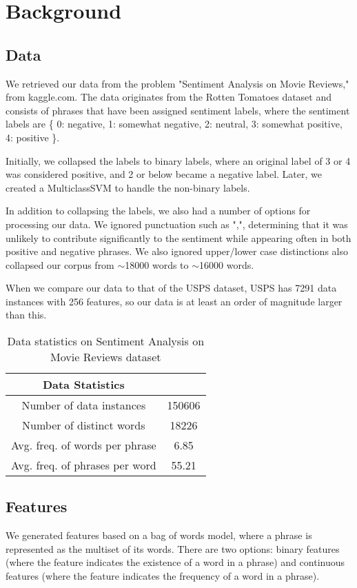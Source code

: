 \documentclass[letterpaper, 11pt]{article}
\begin{document}
\section{Background}

\subsection{Data}
We retrieved our data from the problem "Sentiment Analysis on Movie Reviews," from kaggle.com.  The data originates from the Rotten Tomatoes dataset and consists of phrases that have been assigned sentiment labels, where the sentiment labels are \{ 0: negative, 1: somewhat negative, 2: neutral, 3: somewhat positive, 4: positive \}.

 Initially, we collapsed the labels to binary labels, where an original label of 3 or 4 was considered positive, and 2 or below became a negative label.  Later, we created a MulticlassSVM to handle the non-binary labels.  

 In addition to collapsing the labels, we also had a number of options for processing our data.  We ignored punctuation such as  ",", determining that it was unlikely to contribute significantly to the sentiment while appearing often in both positive and negative phrases.  We also ignored upper/lower case distinctions also collapsed our corpus from $\sim$18000 words to $\sim$16000 words.

 When we compare our data to that of the USPS dataset, USPS has 7291 data instances with 256 features, so our data is at least an order of magnitude larger than this.
\begin{table}
\centering
\label{stats}
\begin{tabular}{cc}
\textbf{Data Statistics}&\\
\hline
Number of data instances & 150606\\
Number of distinct words & 18226\\
Avg. freq. of words per phrase & 6.85\\
Avg. freq. of phrases per word & 55.21
\end{tabular}
\caption{Data statistics on Sentiment Analysis on Movie Reviews dataset}
\end{table}


\subsection{Features}
We generated features based on a bag of words model, where a phrase is represented as the multiset of its words.  There are two options: binary features (where the feature indicates the existence of a word in a phrase) and continuous features (where the feature indicates the frequency of a word in a phrase).
\end{document}
